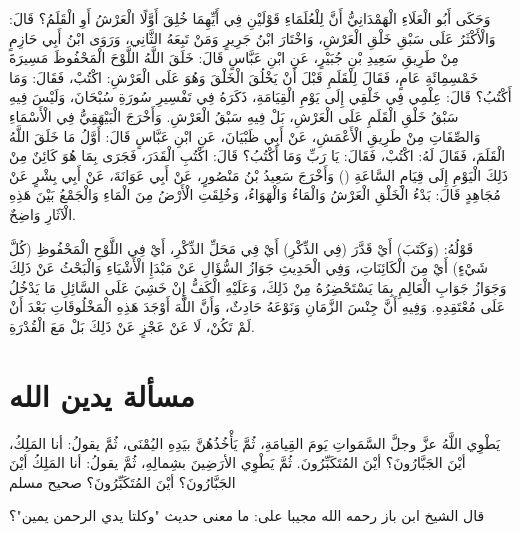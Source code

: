وَحَكَى أَبُو الْعَلَاءِ الْهَمْدَانِيُّ أَنَّ لِلْعُلَمَاءِ قَوْلَيْنِ فِي أَيِّهِمَا خُلِقَ أَوَّلًا الْعَرْشُ أَوِ الْقَلَمُ؟ قَالَ: وَالْأَكْثَرُ عَلَى سَبْقِ خَلْقِ الْعَرْشِ، وَاخْتَارَ ابْنُ جَرِيرٍ وَمَنْ تَبِعَهُ الثَّانِي، وَرَوَى ابْنُ أَبِي حَازِمٍ مِنْ طَرِيقِ سَعِيدِ بْنِ جُبَيْرٍ، عَنِ ابْنِ عَبَّاسٍ قَالَ: خَلَقَ اللَّهُ اللَّوْحَ الْمَحْفُوظَ مَسِيرَةَ خَمْسِمِائَةِ عَامٍ، فَقَالَ لِلْقَلَمِ قَبْلَ أَنْ يَخْلُقَ الْخَلْقَ وَهُوَ عَلَى الْعَرْشِ: اكْتُبْ، فَقَالَ: وَمَا أَكْتُبُ؟ قَالَ: عِلْمِي فِي خَلْقِي إِلَى يَوْمِ الْقِيَامَةِ، ذَكَرَهُ فِي تَفْسِيرِ سُورَةِ سُبْحَانَ، وَلَيْسَ فِيهِ سَبْقُ خَلْقِ الْقَلَمِ عَلَى الْعَرْشِ، بَلْ فِيهِ سَبْقُ الْعَرْشِ. وَأَخْرَجَ الْبَيْهَقِيُّ فِي الْأَسْمَاءِ وَالصِّفَاتِ مِنْ طَرِيقِ الْأَعْمَشِ، عَنْ أَبِي ظَبْيَانَ، عَنِ ابْنِ عَبَّاسٍ قَالَ: أَوَّلُ مَا خَلَقَ اللَّهُ الْقَلَمَ، فَقَالَ لَهُ: اكْتُبْ، فَقَالَ: يَا رَبِّ وَمَا أَكْتُبُ؟ قَالَ: اكْتُبِ الْقَدَرَ، فَجَرَى بِمَا هُوَ كَائِنٌ مِنْ ذَلِكَ الْيَوْمِ إِلَى قِيَامِ السَّاعَةِ () وَأَخْرَجَ سَعِيدُ بْنُ مَنْصُورٍ، عَنْ أَبِي عَوَانَةَ، عَنْ أَبِي بِشْرٍ عَنْ مُجَاهِدٍ قَالَ: بَدْءُ الْخَلْقِ الْعَرْشُ وَالْمَاءُ وَالْهَوَاءُ، وَخُلِقَتِ الْأَرْضُ مِنَ الْمَاءِ وَالْجَمْعُ بَيْنَ هَذِهِ الْآثَارِ وَاضِحٌ.

قَوْلُهُ: (وَكَتَبَ) أَيْ قَدَّرَ (فِي الذِّكْرِ) أَيْ فِي مَحَلِّ الذِّكْرِ، أَيْ فِي اللَّوْحِ الْمَحْفُوظِ (كُلَّ شَيْءٍ) أَيْ مِنَ الْكَائِنَاتِ، وَفِي الْحَدِيثِ جَوَازُ السُّؤَالِ عَنْ مَبْدَإِ الْأَشْيَاءِ وَالْبَحْثُ عَنْ ذَلِكَ وَجَوَازُ جَوَابِ الْعَالِمِ بِمَا يَسْتَحْضِرُهُ مِنْ ذَلِكَ، وَعَلَيْهِ الْكَفُّ إِنْ خَشِيَ عَلَى السَّائِلِ مَا يَدْخُلُ عَلَى مُعْتَقِدِهِ. وَفِيهِ أَنَّ جِنْسَ الزَّمَانِ وَنَوْعَهُ حَادِثٌ، وَأَنَّ اللَّهَ أَوْجَدَ هَذِهِ الْمَخْلُوقَاتِ بَعْدَ أَنْ لَمْ تَكُنْ، لَا عَنْ عَجْزٍ عَنْ ذَلِكَ بَلْ مَعَ الْقُدْرَةِ.

\section{مسألة يدين الله}

يَطْوِي اللَّهُ عزَّ وجلَّ السَّمَواتِ يَومَ القِيامَةِ، ثُمَّ يَأْخُذُهُنَّ بيَدِهِ اليُمْنَى، ثُمَّ يقولُ: أنا المَلِكُ، أيْنَ الجَبَّارُونَ؟ أيْنَ المُتَكَبِّرُونَ. ثُمَّ يَطْوِي الأرَضِينَ بشِمالِهِ، ثُمَّ يقولُ: أنا المَلِكُ أيْنَ الجَبَّارُونَ؟ أيْنَ المُتَكَبِّرُونَ؟
صحيح مسلم

قال الشيخ ابن باز رحمه الله مجيبا على: ما معنى حديث "وكلتا يدي الرحمن يمين"؟


